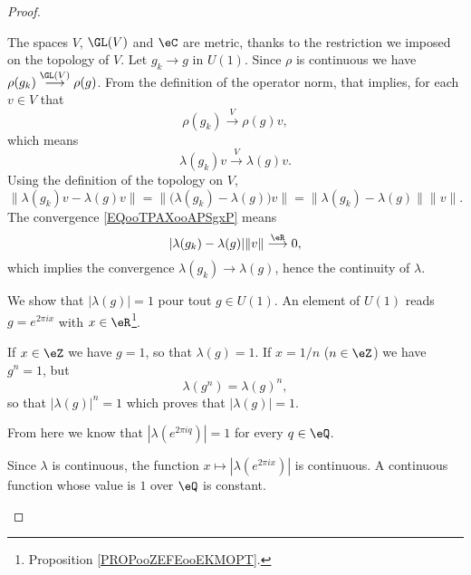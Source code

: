 \begin{proof}
\begin{subproof}
		The spaces \( V\), \( \GL(V)\) and \( \eC\) are metric, thanks to the restriction we imposed on the topology of \( V\). Let \( g_k\to g\) in \( U(1)\). Since \( \rho\) is continuous we have \( \rho(g_k)\stackrel{\GL(V)}{\longrightarrow}\rho(g)\). From the definition of the operator norm, that implies, for each \( v\in V\) that
		\begin{equation}
			\rho(g_k)\stackrel{V}{\longrightarrow}\rho(g)v,
		\end{equation}
		which means
		\begin{equation}        \label{EQooTPAXooAPSgxP}
			\lambda(g_k)v\stackrel{V}{\longrightarrow}\lambda(g)v.
		\end{equation}
		Using the definition of the topology on \( V\),
		\begin{equation}
			\| \lambda(g_k)v-\lambda(g)v \|=\|\big( \lambda(g_k)-\lambda(g) \big)v \|=\| \lambda(g_k)-\lambda(g) \|\| v \|.
		\end{equation}
		The convergence \eqref{EQooTPAXooAPSgxP} means
		\begin{equation}
			| \lambda(g_k)-\lambda(g) |\| v \|\stackrel{\eR}{\longrightarrow}0,
		\end{equation}
		which implies the convergence \( \lambda(g_k)\to \lambda(g)\), hence the continuity of \( \lambda\).


		We show that \( |\lambda(g)|=1\) pour tout \( g\in U(1)\). An element of \( U(1)\) reads \( g= e^{2\pi i x}\) with \( x\in \eR\)\footnote{Proposition \ref{PROPooZEFEooEKMOPT}.}.

		If \( x\in \eZ\) we have \( g=1\), so that \( \lambda(g)=1\). If \( x=1/n\) (\( n\in \eZ\)) we have \( g^n=1\), but
		\begin{equation}
			\lambda(g^n)=\lambda(g)^n,
		\end{equation}
		so that \( | \lambda(g) |^n=1\) which proves that \( | \lambda(g) |=1\).

		From here we know that \( |\lambda( e^{2\pi i q})|=1\) for every \( q\in \eQ\).

		Since \( \lambda\) is continuous, the function \( x\mapsto | \lambda( e^{2\pi i x}) |\) is continuous. A continuous function whose value is \( 1\) over \( \eQ\) is constant.


\end{subproof}
\end{proof}
